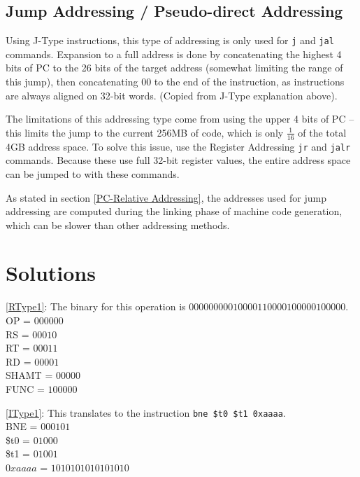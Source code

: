 \documentclass{article}
\begin{document}
\subsection{Jump Addressing / Pseudo-direct Addressing}\label{Jump Addressing}

Using J-Type instructions, this type of addressing is only used for \texttt{j} and \texttt{jal} commands. Expansion to a full address is done by concatenating the highest 4 bits of PC to the 26 bits of the target address (somewhat limiting the range of this jump), then concatenating 00 to the end of the instruction, as instructions are always aligned on 32-bit words. (Copied from J-Type explanation above).

The limitations of this addressing type come from using the upper 4 bits of PC -- this limits the jump to the current 256MB of code, which is only $\frac{1}{16}$ of the total 4GB address space. To solve this issue, use the Register Addressing \texttt{jr} and \texttt{jalr} commands. Because these use full 32-bit register values, the entire address space can be jumped to with these commands. 

As stated in section \ref{PC-Relative Addressing}, the addresses used for jump addressing are computed during the linking phase of machine code generation, which can be slower than other addressing methods. 


\section{Solutions}

\ref{RType1}: The binary for this operation is $000000 00010 00011 00001 00000 100000$. \\ OP = $000000$ \\ RS = $00010$ \\ RT = $00011$ \\ RD = $00001$ \\ SHAMT = $00000$ \\ FUNC = $100000$

\ref{IType1}: This translates to the instruction \texttt{bne \$t0 \$t1 0xaaaa}. \\ BNE = $000101$ \\ \$t0 = $01000$ \\ \$t1 = $01001$ \\ $0xaaaa$ = $1010101010101010$

\printindex
\end{document}
